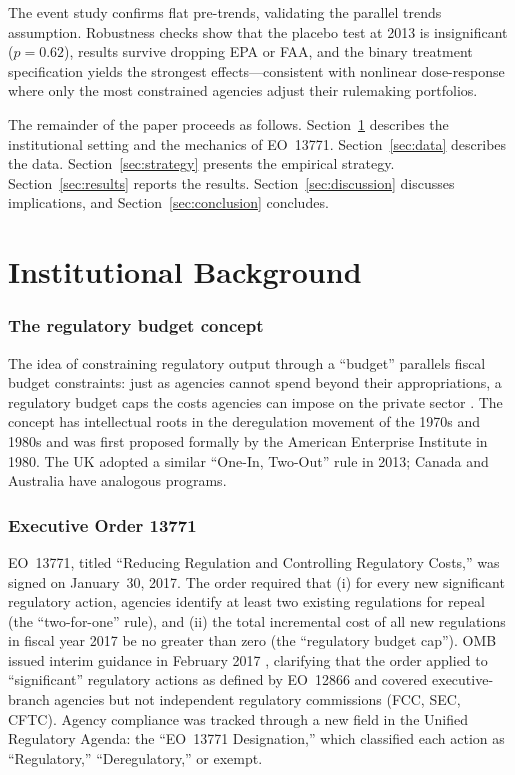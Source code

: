 \documentclass[12pt]{article}
\begin{document}
The event study confirms flat pre-trends, validating the parallel trends assumption. Robustness checks show that the placebo test at 2013 is insignificant ($p = 0.62$), results survive dropping EPA or FAA, and the binary treatment specification yields the strongest effects---consistent with nonlinear dose-response where only the most constrained agencies adjust their rulemaking portfolios.

The remainder of the paper proceeds as follows. Section~\ref{sec:background} describes the institutional setting and the mechanics of EO~13771. Section~\ref{sec:data} describes the data. Section~\ref{sec:strategy} presents the empirical strategy. Section~\ref{sec:results} reports the results. Section~\ref{sec:discussion} discusses implications, and Section~\ref{sec:conclusion} concludes.

\section{Institutional Background}
\label{sec:background}

\subsubsection*{The regulatory budget concept} The idea of constraining regulatory output through a ``budget'' parallels fiscal budget constraints: just as agencies cannot spend beyond their appropriations, a regulatory budget caps the costs agencies can impose on the private sector \citep{dawson2020federal, jacobides2018blueprint}. The concept has intellectual roots in the deregulation movement of the 1970s and 1980s \citep{posner1974theories, peltzman1976toward} and was first proposed formally by the American Enterprise Institute in 1980. The UK adopted a similar ``One-In, Two-Out'' rule in 2013; Canada and Australia have analogous programs.

\subsubsection*{Executive Order 13771} EO~13771, titled ``Reducing Regulation and Controlling Regulatory Costs,'' was signed on January~30, 2017. The order required that (i) for every new significant regulatory action, agencies identify at least two existing regulations for repeal (the ``two-for-one'' rule), and (ii) the total incremental cost of all new regulations in fiscal year 2017 be no greater than zero (the ``regulatory budget cap''). OMB issued interim guidance in February 2017 \citep{oira2017memo}, clarifying that the order applied to ``significant'' regulatory actions as defined by EO~12866 and covered executive-branch agencies but not independent regulatory commissions (FCC, SEC, CFTC). Agency compliance was tracked through a new field in the Unified Regulatory Agenda: the ``EO~13771 Designation,'' which classified each action as ``Regulatory,'' ``Deregulatory,'' or exempt.
\end{document}
